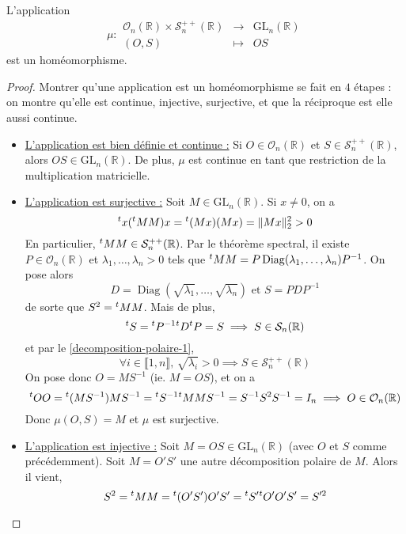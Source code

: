 
	\begin{theorem}
		L'application
		\[ \mu :
		\begin{array}{ccc}
			\mathcal{O}_n(\mathbb{R}) \times \mathcal{S}_n^{++}(\mathbb{R}) &\rightarrow& \mathrm{GL}_n(\mathbb{R}) \\
			(O, S) &\mapsto& OS
		\end{array}
		\]
		est un homéomorphisme.
	\end{theorem}

	\begin{proof}
		Montrer qu'une application est un homéomorphisme se fait en $4$ étapes : on montre qu'elle est continue, injective, surjective, et que la réciproque est elle aussi continue.
		\begin{itemize}
			\item \uline{L'application est bien définie et continue :} Si $O \in \mathcal{O}_n(\mathbb{R})$ et $S \in \mathcal{S}_n^{++}(\mathbb{R})$, alors $OS \in \mathrm{GL}_n(\mathbb{R})$. De plus, $\mu$ est continue en tant que restriction de la multiplication matricielle.
			\item \uline{L'application est surjective :} Soit $M \in \mathrm{GL}_n(\mathbb{R})$. Si $x \neq 0$, on a
			\[ \mathstrut ^t x (\mathstrut ^t M M) x = \mathstrut ^t (Mx) (Mx) = \Vert Mx \Vert_2^2 > 0 \]
			En particulier, $\mathstrut ^t M M \in \mathcal{S}_n^{++}(\mathbb{R})$. Par le théorème spectral, il existe $P \in \mathcal{O}_n(\mathbb{R})$ et $\lambda_1, \dots, \lambda_n > 0$ tels que $\mathstrut ^t M M = P \operatorname{Diag}(\lambda_1, \dots, \lambda_n) P^{-1}$. On pose alors
			\[ D = \operatorname{Diag} \left(\sqrt{\lambda_1}, \dots, \sqrt{\lambda_n} \right) \text{ et } S = P D P^{-1} \]
			de sorte que $S^2 = \mathstrut ^t M M$. Mais de plus,
			\[ \mathstrut ^t S = \mathstrut ^t P^{-1} \mathstrut ^t D \mathstrut ^t P = S \implies S \in \mathcal{S}_n(\mathbb{R}) \]
			et par le \cref{decomposition-polaire-1},
			\[ \forall i \in \llbracket 1, n \rrbracket, \, \sqrt{\lambda_i} > 0 \implies S \in \mathcal{S}_n^{++}(\mathbb{R}) \]
			On pose donc $O = MS^{-1}$ (ie. $M = OS$), et on a
			\[ \mathstrut ^t O O = \mathstrut ^t (MS^{-1}) MS^{-1} = \mathstrut ^t S^{-1} \mathstrut ^t M M S^{-1} = S^{-1} S^2 S^{-1} = I_n \implies O \in \mathcal{O}_n(\mathbb{R}) \]
			Donc $\mu(O, S) = M$ et $\mu$ est surjective.
			\item \uline{L'application est injective :} Soit $M = OS \in \mathrm{GL}_n(\mathbb{R})$ (avec $O$ et $S$ comme précédemment). Soit $M = O'S'$ une autre décomposition polaire de $M$. Alors il vient,
			\[ S^2 = \mathstrut ^t M M = \mathstrut ^t (O'S') O'S' = \mathstrut ^t S' \mathstrut ^t O' O' S' = S'^{2} \]

\end{itemize}
\end{proof}
